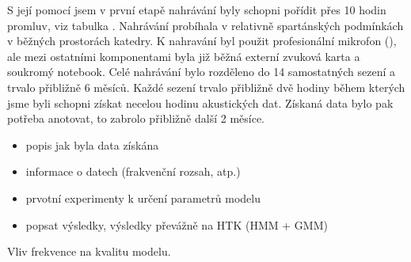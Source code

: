 S její pomocí jsem v první etapě nahrávání byly schopni pořídit přes 10 hodin promluv, viz tabulka . Nahrávání probíhala v relativně spartánských podmínkách v běžných prostorách katedry. K nahravání byl použit profesionální mikrofon (), ale mezi ostatními komponentami byla již běžná externí zvuková karta a soukromý notebook. Celé nahrávání bylo rozděleno do 14 samostatných sezení a trvalo přibližně 6 měsíců. Každé sezení trvalo přibližně dvě hodiny během kterých jsme byli schopni získat necelou hodinu akustických dat. Získaná data bylo pak potřeba anotovat, to zabrolo přibližně další 2 měsíce.


\begin{itemize}
  \item popis jak byla data získána
  \item informace o datech (frakvenční rozsah, atp.)
  \item prvotní experimenty k určení parametrů modelu
  \item popsat výsledky, výsledky převážně na HTK (HMM + GMM)
\end{itemize}


\begin{table}[htpb]
  \centering
  \def\arraystretch{1.5}
  \caption{Vliv frekvence na kvalitu modelu.}
\end{table}
